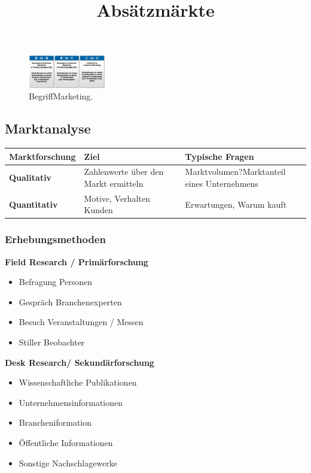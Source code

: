 \documentclass{article}
\begin{document}
\title{Absätzmärkte}

\begin{figure}[H]
\centering
\includegraphics[width=0.3\textwidth]{Resources/Image/Absatzmarkt.png}
\caption{\label{fig:BegriffMarketing}BegriffMarketing.}
\end{figure}


\subsection{Marktanalyse}


														


\begin{tabular}{|l|l|l|}
\hline 
\textbf{Marktforschung} & \textbf{ Ziel} & {Typische Fragen} \\ 
\hline
\rule[-1ex]{0pt}{2.5ex}  
\textbf{Qualitativ} & Zahlenwerte über den Markt ermitteln & Marktvolumen?Marktanteil eines Unternehmens\\ 
\hline 
\textbf{Quantitativ} & Motive, Verhalten Kunden & Erwartungen, Warum kauft  \\ 
\hline 
\end{tabular} 

\subsubsection{Erhebungsmethoden}


\begin{multicols}{2}

\textbf{Field Research / Primärforschung}
\begin{itemize}
	\item Befragung Personen
	\item Gespräch Branchenexperten
	\item Besuch Veranstaltungen / Messen
	\item Stiller Beobachter
\end{itemize}

\columnbreak
\textbf{Desk Research/ Sekundärforschung}
\begin{itemize}
	\item Wissenschaftliche Publikationen
	\item Unternehmensinformationen
	\item Brancheniformation
	\item Öffentliche Informationen
	\item Sonstige Nachschlagewerke
\end{itemize}


\end{multicols}
\end{document}
